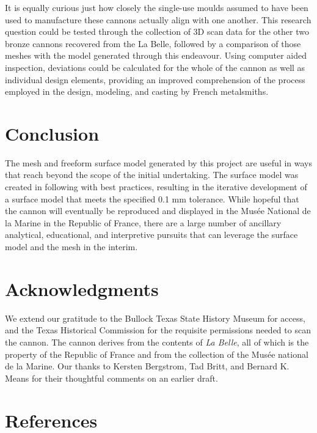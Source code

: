 \documentclass[review]{elsarticle}
\begin{document}
It is equally curious just how closely the single-use moulds assumed to have been used to manufacture these cannons actually align with one another. This research question could be tested through the collection of 3D scan data for the other two bronze cannons recovered from the La Belle, followed by a comparison of those meshes with the model generated through this endeavour. Using computer aided inspection, deviations could be calculated for the whole of the cannon as well as individual design elements, providing an improved comprehension of the process employed in the design, modeling, and casting by French metalsmiths.

\section*{Conclusion}

The mesh and freeform surface model generated by this project are useful in ways that reach beyond the scope of the initial undertaking. The surface model was created in following with best practices, resulting in the iterative development of a surface model that meets the specified 0.1 mm tolerance. While hopeful that the cannon will eventually be reproduced and displayed in the Musée National de la Marine in the Republic of France, there are a large number of ancillary analytical, educational, and interpretive pursuits that can leverage the surface model and the mesh in the interim.

\section*{Acknowledgments}

We extend our gratitude to the Bullock Texas State History Museum for access, and the Texas Historical Commission for the requisite permissions needed to scan the cannon. The cannon derives from the contents of \textit{La Belle}, all of which is the property of the Republic of France and from the collection of the Musée national de la Marine. Our thanks to Kersten Bergstrom, Tad Britt, and Bernard K. Means for their thoughtful comments on an earlier draft.

\section*{References}



\end{document}
